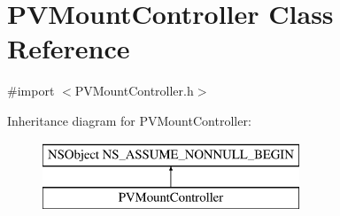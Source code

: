 \hypertarget{interface_p_v_mount_controller}{}\section{P\+V\+Mount\+Controller Class Reference}
\label{interface_p_v_mount_controller}


{\ttfamily \#import $<$P\+V\+Mount\+Controller.\+h$>$}

Inheritance diagram for P\+V\+Mount\+Controller\+:\begin{figure}[H]
\begin{center}
\leavevmode
\includegraphics[height=2.000000cm]{interface_p_v_mount_controller}
\end{center}
\end{figure}
